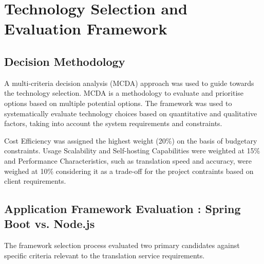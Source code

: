 \section{Technology Selection and Evaluation Framework}

\subsection{Decision Methodology}

A multi-criteria decision analysis (MCDA) approach was used to guide towards the technology selection\cite{mcda}. MCDA is a methodology to evaluate and prioritise options based on multiple potential options. The framework was used to systematically evaluate technology choices based on quantitative and qualitative factors, taking into account the system requirements and constraints.


Cost Efficiency was assigned the highest weight (20\%) on the basis of budgetary constraints. Usage Scalability and Self-hosting Capabilities were weighted at 15\% and Performance Characteristics, such as translation speed and accuracy, were weighed at 10\% considering it as a trade-off for the project contraints based on client requirements.

\subsection{Application Framework Evaluation : Spring Boot vs. Node.js}

The framework selection process evaluated two primary candidates against specific criteria relevant to the translation service requirements.

